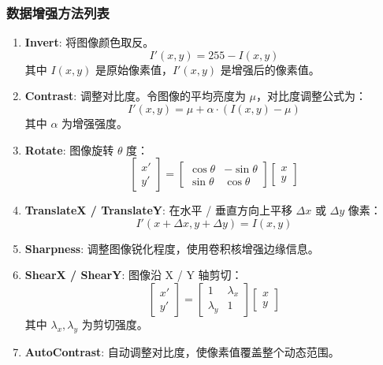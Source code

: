 \documentclass[12pt, a4paper, oneside]{ctexart}
\numberwithin{equation}{section}  %
\begin{document}
\subsubsection{数据增强方法列表}
\begin{enumerate}
    \item \textbf{Invert}: 将图像颜色取反。
    \[
    I'(x, y) = 255 - I(x, y)
    \]
    其中 $I(x, y)$ 是原始像素值，$I'(x, y)$ 是增强后的像素值。

    \item \textbf{Contrast}: 调整对比度。令图像的平均亮度为 $\mu$，对比度调整公式为：
    \[
    I'(x, y) = \mu + \alpha \cdot (I(x, y) - \mu)
    \]
    其中 $\alpha$ 为增强强度。

    \item \textbf{Rotate}: 图像旋转 $\theta$ 度：
    \[
    \begin{bmatrix}
    x' \\ y'
    \end{bmatrix}
    =
    \begin{bmatrix}
    \cos\theta & -\sin\theta \\
    \sin\theta & \cos\theta
    \end{bmatrix}
    \begin{bmatrix}
    x \\ y
    \end{bmatrix}
    \]

    \item \textbf{TranslateX / TranslateY}: 在水平 / 垂直方向上平移 $\Delta x$ 或 $\Delta y$ 像素：
    \[
    I'(x + \Delta x, y + \Delta y) = I(x, y)
    \]

    \item \textbf{Sharpness}: 调整图像锐化程度，使用卷积核增强边缘信息。

    \item \textbf{ShearX / ShearY}: 图像沿 X / Y 轴剪切：
    \[
    \begin{bmatrix}
    x' \\ y'
    \end{bmatrix}
    =
    \begin{bmatrix}
    1 & \lambda_x \\
    \lambda_y & 1
    \end{bmatrix}
    \begin{bmatrix}
    x \\ y
    \end{bmatrix}
    \]
    其中 $\lambda_x, \lambda_y$ 为剪切强度。

    \item \textbf{AutoContrast}: 自动调整对比度，使像素值覆盖整个动态范围。


\end{enumerate}
\end{document}

